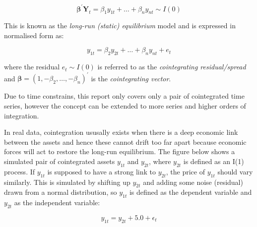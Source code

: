 \documentclass{article}
\begin{document}
\[
\mathbf{\beta^\prime Y}_t = \beta_1 y_{1t} + \dots + \beta_n y_{nt} \sim I(0)
\]

This is known as the \emph{long-run (static) equilibrium} model and is
expressed in normalised form as:

\[
y_{1t} = \beta_2 y_{2t} + \dots + \beta_n y_{nt} + e_t
\]

where the residual \(e_t \sim I(0)\) is referred to as the
\emph{cointegrating residual/spread} and
\(\mathbf{\beta} = (1, -\beta_2, \dots, -\beta_n)^\prime\) is the
\emph{cointegrating vector}.

Due to time constrains, this report only covers only a pair of
cointegrated time series, however the concept can be extended to more
series and higher orders of integration.

In real data, cointegration ususally exists when there is a deep
economic link between the assets and hence these cannot drift too far
apart because economic forces will act to restore the long-run
equilibrium. The figure below shows a simulated pair of cointegrated
assets \(y_{1t}\) and \(y_{2t}\), where \(y_{2t}\) is defined as an I(1)
process. If \(y_{1t}\) is supposed to have a strong link to \(y_{2t}\),
the price of \(y_{1t}\) should vary similarly. This is simulated by
shifting up \(y_{2t}\) and adding some noise (residual) drawn from a
normal distribution, so \(y_{1t}\) is defined as the dependent variable
and \(y_{2t}\) as the independent variable:

\[
y_{1t} = y_{2t} + 5.0 + \epsilon_t
\]
\end{document}

